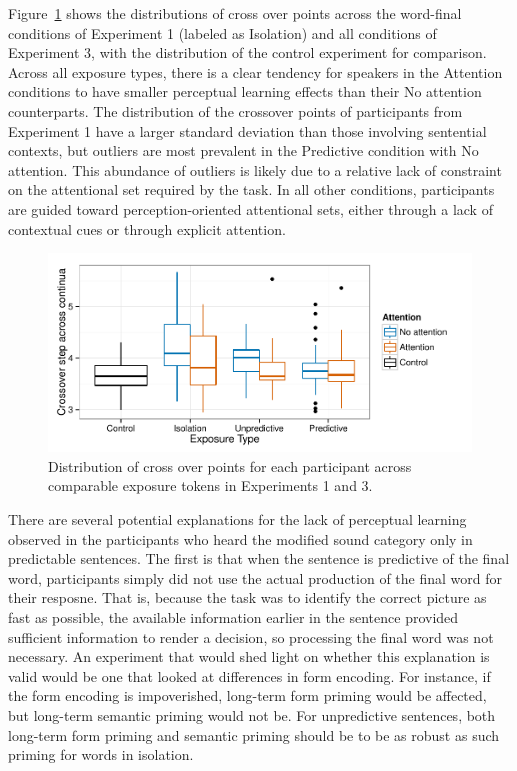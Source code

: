 Figure~\ref{fig:exp13xoverdist} shows the distributions of cross over points across the word-final conditions of Experiment 1 (labeled as Isolation) and all conditions of Experiment 3, with the distribution of the control experiment for comparison.  Across all exposure types, there is a clear tendency for speakers in the Attention conditions to have smaller perceptual learning effects than their No attention counterparts.  The distribution of the crossover points of participants from Experiment 1 have a larger standard deviation than those involving sentential contexts, but outliers are most prevalent in the Predictive condition with No attention.  This abundance of outliers is likely due to a relative lack of constraint on the attentional set required by the task.  In all other conditions, participants are guided toward perception-oriented attentional sets, either through a lack of contextual cues or through explicit attention.

\begin{figure}[!ht]
\caption{Distribution of cross over points for each participant across comparable exposure tokens in Experiments 1 and 3.}
\label{fig:exp13xoverdist}
\begin{center}
\includegraphics[width=\textwidth]{graphs/exp13_xoverdist}
\end{center}
\end{figure}

There are several potential explanations for the lack of perceptual learning observed in the participants who heard the modified sound category only in predictable sentences.
The first is that when the sentence is predictive of the final word, participants simply did not use the actual production of the final word for their resposne.  
That is, because the task was to identify the correct picture as fast as possible, the available information earlier in the sentence provided sufficient information to render a decision, so processing the final word was not necessary.  An experiment that would shed light on whether this explanation is valid would be one that looked at differences in form encoding.  For instance, if the form encoding is impoverished, long-term form priming would be affected, but long-term semantic priming would not be.  For unpredictive sentences, both long-term form priming and semantic priming should be to be as robust as such priming for words in isolation.

